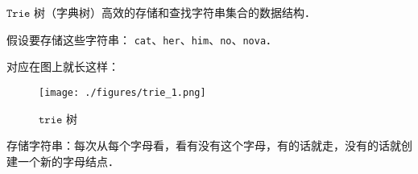 
$\mathtt{Trie}$ 树（字典树）高效的存储和查找字符串集合的数据结构．

假设要存储这些字符串：
\verb|cat|、\verb|her|、\verb|him|、\verb|no|、\verb|nova|．

对应在图上就长这样：\begin{figure}[ht]
\centering
\texttt{[image: ./figures/trie\_1.png]}
\caption{$\mathtt{trie}$ 树} \label{trie_fig1}
\end{figure}

存储字符串：每次从每个字母看，看有没有这个字母，有的话就走，没有的话就创建一个新的字母结点．
